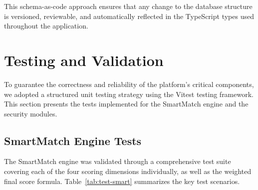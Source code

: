 This schema-as-code approach ensures that any change to the database structure is versioned, reviewable, and automatically reflected in the TypeScript types used throughout the application.

\section{Testing and Validation}

To guarantee the correctness and reliability of the platform's critical components, we adopted a structured unit testing strategy using the Vitest testing framework. This section presents the tests implemented for the SmartMatch engine and the security modules.

\subsection{SmartMatch Engine Tests}

The SmartMatch engine was validated through a comprehensive test suite covering each of the four scoring dimensions individually, as well as the weighted final score formula. Table~\ref{tab:test-smart} summarizes the key test scenarios.

